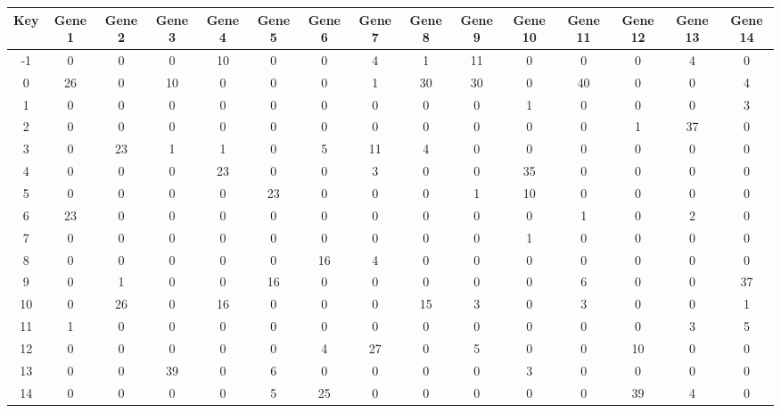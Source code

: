 \begin{tabular}{|c|c|c|c|c|c|c|c|c|c|c|c|c|c|c|}
\hline
Key & Gene 1 & Gene 2 & Gene 3 & Gene 4 & Gene 5 & Gene 6 & Gene 7 & Gene 8 & Gene 9 & Gene 10 & Gene 11 & Gene 12 & Gene 13 & Gene 14 \\
\hline
-1 & 0 & 0 & 0 & 10 & 0 & 0 & 4 & 1 & 11 & 0 & 0 & 0 & 4 & 0 \\
0 & 26 & 0 & 10 & 0 & 0 & 0 & 1 & 30 & 30 & 0 & 40 & 0 & 0 & 4 \\
1 & 0 & 0 & 0 & 0 & 0 & 0 & 0 & 0 & 0 & 1 & 0 & 0 & 0 & 3 \\
2 & 0 & 0 & 0 & 0 & 0 & 0 & 0 & 0 & 0 & 0 & 0 & 1 & 37 & 0 \\
3 & 0 & 23 & 1 & 1 & 0 & 5 & 11 & 4 & 0 & 0 & 0 & 0 & 0 & 0 \\
4 & 0 & 0 & 0 & 23 & 0 & 0 & 3 & 0 & 0 & 35 & 0 & 0 & 0 & 0 \\
5 & 0 & 0 & 0 & 0 & 23 & 0 & 0 & 0 & 1 & 10 & 0 & 0 & 0 & 0 \\
6 & 23 & 0 & 0 & 0 & 0 & 0 & 0 & 0 & 0 & 0 & 1 & 0 & 2 & 0 \\
7 & 0 & 0 & 0 & 0 & 0 & 0 & 0 & 0 & 0 & 1 & 0 & 0 & 0 & 0 \\
8 & 0 & 0 & 0 & 0 & 0 & 16 & 4 & 0 & 0 & 0 & 0 & 0 & 0 & 0 \\
9 & 0 & 1 & 0 & 0 & 16 & 0 & 0 & 0 & 0 & 0 & 6 & 0 & 0 & 37 \\
10 & 0 & 26 & 0 & 16 & 0 & 0 & 0 & 15 & 3 & 0 & 3 & 0 & 0 & 1 \\
11 & 1 & 0 & 0 & 0 & 0 & 0 & 0 & 0 & 0 & 0 & 0 & 0 & 3 & 5 \\
12 & 0 & 0 & 0 & 0 & 0 & 4 & 27 & 0 & 5 & 0 & 0 & 10 & 0 & 0 \\
13 & 0 & 0 & 39 & 0 & 6 & 0 & 0 & 0 & 0 & 3 & 0 & 0 & 0 & 0 \\
14 & 0 & 0 & 0 & 0 & 5 & 25 & 0 & 0 & 0 & 0 & 0 & 39 & 4 & 0 \\
\hline
\end{tabular}